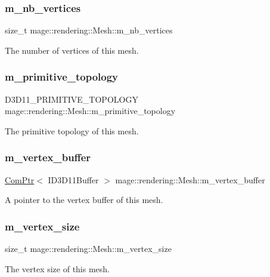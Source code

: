 \subsubsection{\texorpdfstring{m\+\_\+nb\+\_\+vertices}{m\_nb\_vertices}}
{\footnotesize\ttfamily size\+\_\+t mage\+::rendering\+::\+Mesh\+::m\+\_\+nb\+\_\+vertices\hspace{0.3cm}{\ttfamily [private]}}

The number of vertices of this mesh. \hypertarget{classmage_1_1rendering_1_1_mesh_a9ae7ea29fac3acb3fe17317c21242ee9}{}\label{classmage_1_1rendering_1_1_mesh_a9ae7ea29fac3acb3fe17317c21242ee9} 
\subsubsection{\texorpdfstring{m\+\_\+primitive\+\_\+topology}{m\_primitive\_topology}}
{\footnotesize\ttfamily D3\+D11\+\_\+\+P\+R\+I\+M\+I\+T\+I\+V\+E\+\_\+\+T\+O\+P\+O\+L\+O\+GY mage\+::rendering\+::\+Mesh\+::m\+\_\+primitive\+\_\+topology\hspace{0.3cm}{\ttfamily [private]}}

The primitive topology of this mesh. \hypertarget{classmage_1_1rendering_1_1_mesh_aa3cf2b0ad192e2b3b371655ee49eb4f4}{}\label{classmage_1_1rendering_1_1_mesh_aa3cf2b0ad192e2b3b371655ee49eb4f4} 
\subsubsection{\texorpdfstring{m\+\_\+vertex\+\_\+buffer}{m\_vertex\_buffer}}
{\footnotesize\ttfamily \hyperlink{namespacemage_ae74f374780900893caa5555d1031fd79}{Com\+Ptr}$<$ I\+D3\+D11\+Buffer $>$ mage\+::rendering\+::\+Mesh\+::m\+\_\+vertex\+\_\+buffer\hspace{0.3cm}{\ttfamily [protected]}}

A pointer to the vertex buffer of this mesh. \hypertarget{classmage_1_1rendering_1_1_mesh_a52a754eeef69dfa642dc483025f7bb21}{}\label{classmage_1_1rendering_1_1_mesh_a52a754eeef69dfa642dc483025f7bb21} 
\subsubsection{\texorpdfstring{m\+\_\+vertex\+\_\+size}{m\_vertex\_size}}
{\footnotesize\ttfamily size\+\_\+t mage\+::rendering\+::\+Mesh\+::m\+\_\+vertex\+\_\+size\hspace{0.3cm}{\ttfamily [private]}}

The vertex size of this mesh. 